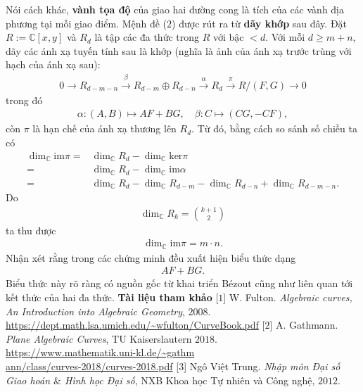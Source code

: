 \begin{multicols}{2}
	Nói cách khác, {\bf\color{duongvaotoanhoc} vành tọa độ} của giao hai đường cong là tích của các vành địa phương tại mỗi giao điểm.
	\vskip 0.1cm
	Mệnh đề ($2$) được rút ra từ  \textbf{\color{duongvaotoanhoc}dãy khớp}  sau đây. Đặt $R:=\mathbb C[x,y]$ và $R_d$ là tập các đa thức trong $R$ với bậc $<d$.
	Với mỗi $d\geq m+n$, dãy các ánh xạ tuyến tính sau là khớp (nghĩa là ảnh của ánh xạ trước trùng với hạch của ánh xạ sau):
	\begin{align*}
		0\longrightarrow R_{d-m-n}\stackrel\beta\longrightarrow 
		R_{d-m}\oplus R_{d-n} \stackrel\alpha\longrightarrow R_d\stackrel\pi\longrightarrow R/(F,G)\longrightarrow 0	
	\end{align*}
	trong đó  
	\begin{align*}
		\alpha: (A,B)\longmapsto AF+BG,\quad \beta: C\longmapsto (CG,-CF),
	\end{align*}
	còn $\pi$ là hạn chế của ánh xạ thương lên $R_d$. Từ đó, bằng cách so sánh số chiều ta có 
	\begin{align*} \dim_{\mathbb C}\textrm{im}\pi=&\dim_{\mathbb C}R_d-\dim_{\mathbb C}\textrm{ker}\pi\\
		=& \dim_{\mathbb C}R_d-\dim_{\mathbb C}\textrm{im}\alpha\\
		=& \dim_{\mathbb C}R_d-\dim_{\mathbb C}R_{d-m}-\dim_{\mathbb C}R_{d-n}+ 
		\dim_{\mathbb C}R_{d-m-n}.
	\end{align*}
	Do
	\begin{align*}
		\dim_{\mathbb C}R_k={k+1\choose 2}
	\end{align*}
	ta thu được 
	\begin{align*}
		\dim_{\mathbb C}\textrm{im}\pi=  m\cdot n.
	\end{align*}
	Nhận xét rằng trong các chứng minh đều xuất hiện biểu thức dạng
	\begin{align*}
		AF+BG.
	\end{align*}
	Biểu thức này rõ ràng có nguồn gốc từ khai triển Bézout cũng như liên quan tới kết thức của hai đa thức. 
	\vskip 0.1cm
	\textbf{\color{duongvaotoanhoc}Tài liệu tham khảo}
	\vskip 0.1cm
	[$1$]  W. Fulton. {\em Algebraic curves, An Introduction into Algebraic Geometry}, $2008$.\\
	\url{https://dept.math.lsa.umich.edu/~wfulton/CurveBook.pdf}
	\vskip 0.1cm
	[$2$]  A. Gathmann. {\em Plane Algebraic Curves}, TU Kaiserslautern $2018$.\\ 
	\url{https://www.mathematik.uni-kl.de/~gathm}\\ \url{ann/class/curves-2018/curves-2018.pdf}
	\vskip 0.1cm	
	[$3$] Ngô Việt Trung. {\em Nhập môn Đại số Giao hoán $\&$ Hình học Đại số}, NXB Khoa học Tự nhiên và Công nghệ, $2012$.
\end{multicols}